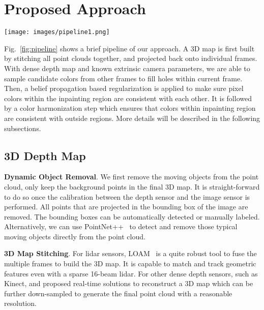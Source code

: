 \documentclass[runningheads]{llncs}
\begin{document}
\section{Proposed Approach}

\begin{figure*}[t!]
\centering
\texttt{[image: images/pipeline1.png]}
   \caption{Frame-wise point clouds (a) are stitched into a 3D map (b) using LOAM. The 3D map is projected onto a frame (c) to generate a depth map. For each pixel in the target region (e), we use its depth (d) as guidance to sample colors from other frames (f). Final pixel values are determined by BP regularization and color harmonization to ensure photometric consistency. (g) shows the final inpainting result.}
\label{fig:pipeline}
\end{figure*}


Fig.~\ref{fig:pipeline} shows a brief pipeline of our approach. A 3D map is first built by stitching all point clouds together, and projected back onto individual frames. With dense depth map and known extrinsic camera parameters, we are able to sample candidate colors from other frames to fill holes within current frame. Then, a belief propagation based regularization is applied to make sure pixel colors within the inpainting region are consistent with each other. It is followed by a color harmonization step which ensures that colors within inpainting region are consistent with outside regions. More details will be described in the following subsections.



\subsection{3D Depth Map}

\textbf{Dynamic Object Removal}. We first remove the moving objects from the point cloud, only keep the background points in the final 3D map. It is straight-forward to do so once the calibration between the depth sensor and the image sensor is performed. All points that are projected in the bounding box of the image are removed. The bounding boxes can be automatically detected or manually labeled. Alternatively, we can use PointNet++~\cite{qi2017pointnetplusplus} to detect and remove those typical moving objects directly from the point cloud.

\textbf{3D Map Stitching}. For lidar sensors, LOAM~\cite{Zhang-2014-7903} is a quite robust tool to fuse the multiple frames to build the 3D map. It is capable to match and track geometric features even with a sparse 16-beam lidar. For other dense depth sensors, such as Kinect, \cite{Izadi:2011:KRR:2047196.2047270} and \cite{6130321} proposed real-time solutions to reconstruct a 3D map which can be further down-sampled to generate the final point cloud with a reasonable resolution.
\end{document}
